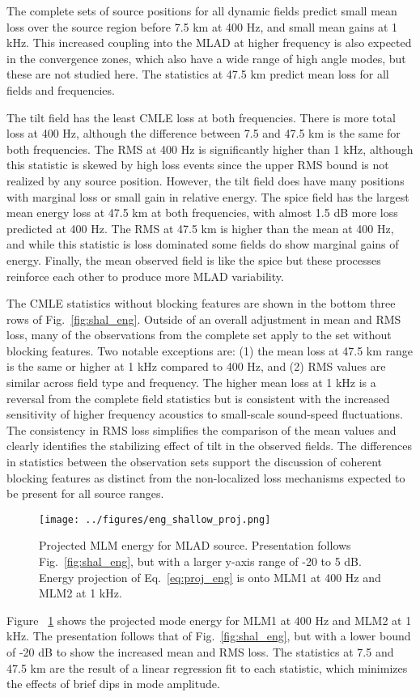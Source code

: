 \documentclass[preprint,NumberedRefs]{JASA}
\begin{document}
The complete sets of source positions for all dynamic fields predict small mean loss over the source region before 7.5 km at 400 Hz, and small mean gains at 1 kHz. This increased coupling into the MLAD at higher frequency is also expected in the convergence zones, which also have a wide range of high angle modes, but these are not studied here. The statistics at 47.5 km predict mean loss for all fields and frequencies.

The tilt field has the least CMLE loss at both frequencies. There is more total loss at 400 Hz, although the difference between 7.5 and 47.5 km is the same for both frequencies. The RMS at 400 Hz is significantly higher than 1 kHz, although this statistic is skewed by high loss events since the upper RMS bound is not realized by any source position. However, the tilt field does have many positions with marginal loss or small gain in relative energy. The spice field has the largest mean energy loss at 47.5 km at both frequencies, with almost 1.5 dB more loss predicted at 400 Hz. The RMS at 47.5 km is higher than the mean at 400 Hz, and while this statistic is loss dominated some fields do show marginal gains of energy. Finally, the mean observed field is like the spice but these processes reinforce each other to produce more MLAD variability.

The CMLE statistics without blocking features are shown in the bottom three rows of Fig.~\ref{fig:shal_eng}. Outside of an overall adjustment in mean and RMS loss, many of the observations from the complete set apply to the set without blocking features. Two notable exceptions are: (1) the mean loss at 47.5 km range is the same or higher at 1 kHz compared to 400 Hz, and (2) RMS values are similar across field type and frequency. The higher mean loss at 1 kHz is a reversal from the complete field statistics but is consistent with the increased sensitivity of higher frequency acoustics to small-scale sound-speed fluctuations. The consistency in RMS loss simplifies the comparison of the mean values and clearly identifies the stabilizing effect of tilt in the observed fields. The differences in statistics between the observation sets support the discussion of coherent blocking features as distinct from the non-localized loss mechanisms expected to be present for all source ranges.

\begin{figure}
\texttt{[image: ../figures/eng\_shallow\_proj.png]}
    \caption{Projected MLM energy for MLAD source. Presentation follows Fig.~\ref{fig:shal_eng}, but with a larger y-axis range of -20 to 5 dB. Energy projection of Eq.~\eqref{eq:proj_eng} is onto MLM1 at 400 Hz and MLM2 at 1 kHz.}
    \label{fig:shal_proj}
\end{figure}
Figure ~\ref{fig:shal_proj} shows the projected mode energy for MLM1 at 400 Hz and MLM2 at 1 kHz. The presentation follows that of Fig.~\ref{fig:shal_eng}, but with a lower bound of -20 dB to show the increased mean and RMS loss. The statistics at 7.5 and 47.5 km are the result of a linear regression fit to each statistic, which minimizes the effects of brief dips in mode amplitude.
\end{document}
